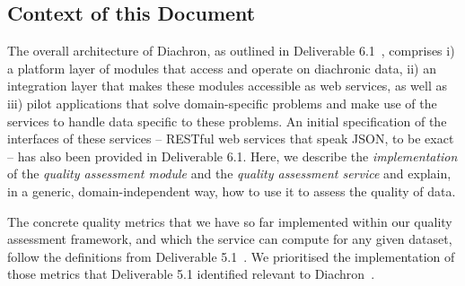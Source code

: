 
\subsection{Context of this Document}
\label{sec:ContextDoc} 

The overall architecture of Diachron, as outlined in Deliverable 6.1~\cite[section~5]{diachron-d6.1}, comprises i) a platform layer of modules that access and operate on diachronic data, ii) an integration layer that makes these modules accessible as web services, as well as iii) pilot applications that solve domain-specific problems and make use of the services to handle data specific to these problems.  An initial specification of the interfaces of these services – RESTful web services that speak JSON, to be exact – has also been provided in Deliverable 6.1.  Here, we describe the \emph{implementation} of the \emph{quality assessment module} and the \emph{quality assessment service} and explain, in a generic, domain-independent way, how to use it to assess the quality of data.

The concrete quality metrics that we have so far implemented within our quality assessment framework, and which the service can compute for any given dataset, follow the definitions from Deliverable 5.1~\cite{diachron-d5.1}.
We prioritised the implementation of those metrics that Deliverable 5.1 identified relevant to Diachron~\cite[section~4]{diachron-d5.1}.



